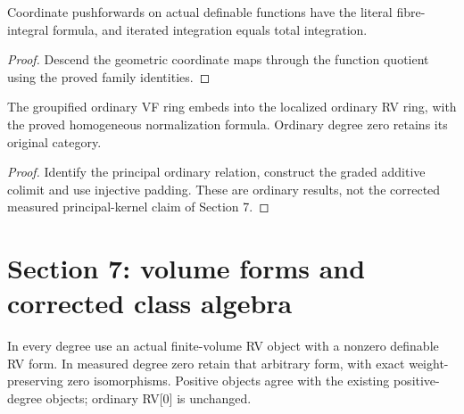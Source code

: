 \begin{proposition}

\label{s6-21}


\leanok

Coordinate pushforwards on actual definable functions have the literal fibre-integral formula, and iterated integration equals total integration.

\end{proposition}

\begin{proof}


\leanok

Descend the geometric coordinate maps through the function quotient using the proved family identities.

\end{proof}

\begin{theorem}

\label{s6-22}


\leanok

The groupified ordinary VF ring embeds into the localized ordinary RV ring, with the proved homogeneous normalization formula. Ordinary degree zero retains its original category.

\end{theorem}

\begin{proof}


\leanok

Identify the principal ordinary relation, construct the graded additive colimit and use injective padding. These are ordinary results, not the corrected measured principal-kernel claim of Section 7.

\end{proof}

\section{Section 7: volume forms and corrected class algebra}


\begin{definition}

\label{s7-zero-rv}


\leanok

In every degree use an actual finite-volume RV object with a nonzero definable RV form. In measured degree zero retain that arbitrary form, with exact weight-preserving zero isomorphisms. Positive objects agree with the existing positive-degree objects; ordinary RV[0] is unchanged.

\end{definition}

